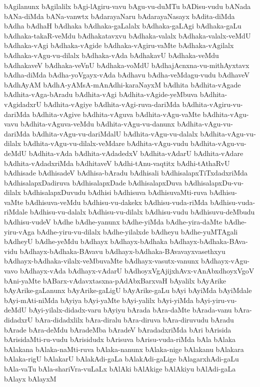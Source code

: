 {bAgilanunx
bAgilalilx
bAgi-lAgiru-vavu
bAgu-vu-duMTu
bADisu-vudu
bANada
bANa-diMda
bANa-vanwtx
bAdarayaNaru
bAdarayaNasayx
bAdita-diMda
bAdha
bAdhaH
bAdhaka
bAdhaka-gaLalalx
bAdhaka-gaLAgi
bAdhaka-gaLu
bAdhaka-takaR-veMdu
bAdhakatavxvu
bAdhaka-valalx
bAdhaka-valalx-veMdU
bAdhaka-vAgi
bAdhaka-vAgide
bAdhaka-vAgiru-vaMte
bAdhaka-vAgilalx
bAdhaka-vAgu-vu-dilalx
bAdhaka-vAda
bAdhakavU
bAdhaka-veMdu
bAdhakaveV
bAdhaka-veVnU
bAdhaka-voMdU
bAdhajAcnxna-vu-mithAyxtavx
bAdha-diMda
bAdha-yoVgayx-vAda
bAdhavu
bAdha-veMdagu-vudu
bAdhaveV
bAdhAyAM
bAdhA-yAMsA-mAnAdhi-karaNayxM
bAdhita
bAdhita-vAgade
bAdhita-vAga-bAradu
bAdhita-vAgi
bAdhita-vAgide-yeMbuva
bAdhita-vAgidadxrU
bAdhita-vAgiye
bAdhita-vAgi-ruva-dariMda
bAdhita-vAgiru-vu-dariMda
bAdhita-vAgive
bAdhita-vAguva
bAdhita-vAgu-vaMte
bAdhita-vAgu-vavu
bAdhita-vAguva-veMdu
bAdhita-vAgu-vu-danunx
bAdhita-vAgu-vu-dariMda
bAdhita-vAgu-vu-dariMdalU
bAdhita-vAgu-vu-dalalx
bAdhita-vAgu-vu-dilalx
bAdhita-vAgu-vu-dilalx-veMdare
bAdhita-vAgu-vudu
bAdhita-vAgu-vu-deMdU
bAdhita-vAda
bAdhita-vAdadedxV
bAdhita-vAdarU
bAdhita-vAdare
bAdhita-vAdadxriMda
bAdhitaveV
bAdhi-tAnu-vaqtitx
bAdhi-tAthaRvU
bAdhisade
bAdhisadeV
bAdhisa-bAradu
bAdhisali
bAdhisalapxTiTxdadxriMda
bAdhisalapxDadiruva
bAdhisalapxDade
bAdhisalapxDuva
bAdhisalapxDu-vu-dilalx
bAdhisalapxDuvudu
bAdhisi
bAdhisuva
bAdhisuvaMti-ruva
bAdhisu-vaMte
bAdhisuva-veMdu
bAdhisu-vu-dakekx
bAdhisu-vuda-riMda
bAdhisu-vuda-riMdale
bAdhisu-vu-dalalx
bAdhisu-vu-dilalx
bAdhisu-vudu
bAdhisuvu-deMbudu
bAdhisu-vudeV
bAdhe
bAdhe-yanunx
bAdhe-yiMda
bAdhe-yira-daMte
bAdhe-yiru-vAga
bAdhe-yiru-vu-dilalx
bAdhe-yilalxde
bAdheyu
bAdhe-yuMTAgali
bAdheyU
bAdhe-yeMdu
bAdhayx
bAdhayx-bAdhaka
bAdhayx-bAdhaka-BAva-vidu
bAdhayx-bAdhaka-BAvavu
bAdhayx-bAdhaka-BAvavayxvasethxyu
bAdhayx-bAdhaka-vilalx-veMbuvaMte
bAdhayx-vasutx-vanunx
bAdhayx-vAgu-vavo
bAdhayx-vAda
bAdhayx-vAdarU
bAdhoyxVgAjijxhAvx-vAnAbxdhoyxVgoV
bAni-yaMte
bABarx-vAdavxtasxna-pAdAbxBarxvaH
bAyalilx
bAyArike
bAyArike-gaLanunx
bAyArike-gaLigU
bAyArike-gaLu
bAyi
bAyiMda
bAyiMdale
bAyi-mAti-niMda
bAyiya
bAyi-yaMte
bAyi-yalilx
bAyi-yiMda
bAyi-yiru-vu-deMdU
bAyi-yilalx-didadx-varu
bAyiyu
bArada
bAra-daMte
bArada-vanu
bAra-didadxrU
bAra-didadxlilx
bAra-diralu
bAra-diruva
bAra-diruvudu
bAradu
bArade
bAra-deMdu
bAradeMba
bAradeV
bAradadxriMda
bAri
bArisida
bArisidaMti-ru-vudu
bArisidudx
bArisuva
bArisu-vuda-riMda
bAla
bAlaka
bAlakana
bAlaka-naMti-ruva
bAlaka-nanunx
bAlaka-nige
bAlakanu
bAlakara
bAlaka-rigU
bAlakarU
bAlakAdi-gaLa
bAlakAdi-gaLige
bAlagarxhAdi-gaLu
bAla-vaTu
bAla-shariVra-vuLaLx
bAlAki
bAlAkige
bAlAkiyu
bAlAdi-gaLa
bAlayx
bAlayxM
}

